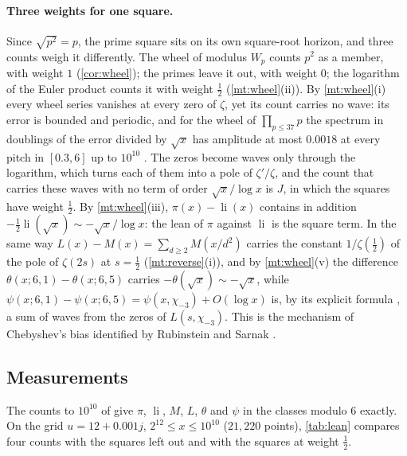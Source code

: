 \documentclass[11pt]{article}
\theoremstyle{definition}\newtheorem{definition}[theorem]{Definition}
\theoremstyle{remark}\newtheorem{remark}[theorem]{Remark}
\theoremstyle{definition}\newtheorem{axiom}{Axiom}
\newcommand{\li}{\operatorname{li}}\newcommand{\Tr}{\operatorname{Tr}}
\begin{document}
\paragraph{Three weights for one square.} Since $\sqrt{p^2}=p$, the prime square sits on its own square-root horizon, and three counts weigh it differently. The wheel of modulus $W_p$ counts $p^2$ as a member, with weight $1$ (\cref{cor:wheel}); the primes leave it out, with weight $0$; the logarithm of the Euler product counts it with weight $\frac12$ (\cref{mt:wheel}(ii)). By \cref{mt:wheel}(i) every wheel series vanishes at every zero of $\zeta$, yet its count carries no wave: its error is bounded and periodic, and for the wheel of $\prod_{p\le37}p$ the spectrum in doublings of the error divided by $\sqrt x$ has amplitude at most $0.0018$ at every pitch in $[0.3,6]$ up to $10^{10}$ \cite{S10}. The zeros become waves only through the logarithm, which turns each of them into a pole of $\zeta'/\zeta$, and the count that carries these waves with no term of order $\sqrt x/\log x$ is $J$, in which the squares have weight $\frac12$. By \cref{mt:wheel}(iii), $\pi(x)-\li(x)$ contains in addition $-\frac12\li(\sqrt x)\sim-\sqrt x/\log x$: the lean of $\pi$ against $\li$ is the square term. In the same way $L(x)-M(x)=\sum_{d\ge2}M(x/d^2)$ carries the constant $1/\zeta(\frac12)$ of the pole of $\zeta(2s)$ at $s=\frac12$ (\cref{mt:reverse}(i)), and by \cref{mt:wheel}(v) the difference $\theta(x;6,1)-\theta(x;6,5)$ carries $-\theta(\sqrt x)\sim-\sqrt x$, while $\psi(x;6,1)-\psi(x;6,5)=\psi(x,\chi_{-3})+O(\log x)$ is, by its explicit formula \cite[Ch.~19]{Davenport}, a sum of waves from the zeros of $L(s,\chi_{-3})$. This is the mechanism of Chebyshev's bias identified by Rubinstein and Sarnak \cite{RubinsteinSarnak}.

\subsection{Measurements}

The counts to $10^{10}$ of \cite{S10} give $\pi$, $\li$, $M$, $L$, $\theta$ and $\psi$ in the classes modulo $6$ exactly. On the grid $u=12+0.001j$, $2^{12}\le x\le10^{10}$ ($21{,}220$ points), \cref{tab:lean} compares four counts with the squares left out and with the squares at weight $\frac12$.
\end{document}
